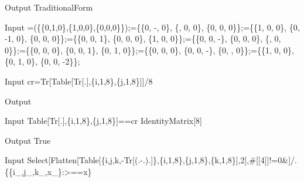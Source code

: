 
\begin{mmaCell}{Output}
  TraditionalForm
\end{mmaCell}

\begin{mmaCell}{Input}
  =(\{\{0,1,0\},\{1,0,0\},\{0,0,0\}\});=\{\{0, -, 0\}, \{, 0, 0\}, \{0,
0, 0\}\};=\{\{1, 0, 0\}, \{0, -1, 0\}, \{0, 0, 0\}\};=\{\{0, 0, 1\}, \{0, 0, 0\}, \{1, 0, 0\}\};=\{\{0,
0, -\}, \{0, 0, 0\}, \{, 0, 0\}\};=\{\{0, 0, 0\}, \{0, 0, 1\}, \{0, 1, 0\}\};=\{\{0,
0, 0\}, \{0, 0, -\}, \{0, , 0\}\};=\{\{1, 0, 0\}, \{0, 1, 0\}, \{0, 0, -2\}\};
\end{mmaCell}

\begin{mmaCell}[moredefined={cr},morefunctionlocal={i, j}]{Input}
  cr=Tr[Table[Tr[.],\{i,1,8\},\{j,1,8\}]]/8
\end{mmaCell}

\begin{mmaCell}{Output}
\end{mmaCell}

\begin{mmaCell}[morefunctionlocal={i, j},moredefined={cr}]{Input}
  Table[Tr[.],\{i,1,8\},\{j,1,8\}]==cr IdentityMatrix[8]
\end{mmaCell}

\begin{mmaCell}{Output}
  True
\end{mmaCell}

\begin{mmaCell}[morefunctionlocal={i, j, k},moredefined={cr},morepattern={\#, i_, j_, k_, x_, x}]{Input}
  Select[Flatten[Table[\{i,j,k,-Tr[(.-.).]\},\{i,1,8\},\{j,1,8\},\{k,1,8\}],2],#[[4]]!=0&]/.\{\{i_,j_,k_,x_\}:>==x\}
\end{mmaCell}

